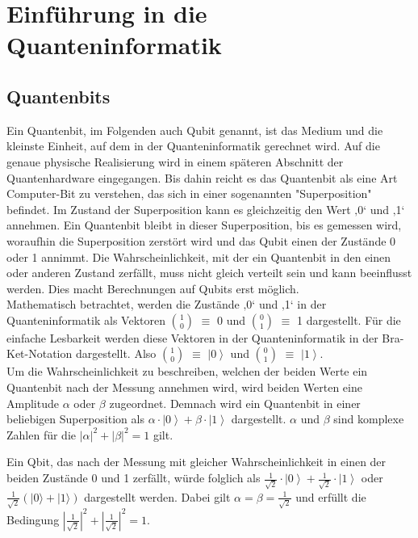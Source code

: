 \section{Einführung in die Quanteninformatik} 
\label{sec:Einführung in die Quanteninformatik}
\subsection{Quantenbits}
Ein Quantenbit, im Folgenden auch Qubit genannt, ist das Medium und die kleinste Einheit, auf dem in der Quanteninformatik gerechnet wird. Auf die genaue physische Realisierung wird in einem späteren Abschnitt der Quantenhardware eingegangen. Bis dahin reicht es das Quantenbit als eine Art Computer-Bit zu verstehen, das sich in einer sogenannten "Superposition" befindet. Im Zustand der Superposition kann es gleichzeitig den Wert ‚0‘ und ‚1‘ annehmen. Ein Quantenbit bleibt in dieser Superposition, bis es gemessen wird, woraufhin die Superposition zerstört wird und das Qubit einen der Zustände 0 oder 1 annimmt. Die Wahrscheinlichkeit, mit der ein Quantenbit in den einen oder anderen Zustand zerfällt, muss nicht gleich verteilt sein und kann beeinflusst werden. Dies macht Berechnungen auf Qubits erst möglich.\\

Mathematisch betrachtet, werden die Zustände ‚0‘ und ‚1‘ in der Quanteninformatik als Vektoren \(\binom{1}{0}\) $\equiv$ 0 und \(\binom{0}{1}\) $\equiv$ 1 dargestellt. Für die einfache Lesbarkeit werden diese Vektoren in der Quanteninformatik in der Bra-Ket-Notation dargestellt.
Also \(\binom{1}{0}\) $\equiv$ $\left|0\right\rangle$ und \(\binom{0}{1}\) $\equiv$ $\left|1\right\rangle$. \\

Um die Wahrscheinlichkeit zu beschreiben, welchen der beiden Werte ein Quantenbit nach der Messung annehmen wird, wird beiden Werten eine Amplitude $\alpha$ oder $\beta$ zugeordnet. Demnach wird ein Quantenbit in einer beliebigen Superposition als $\alpha\cdot\left|0\right\rangle+\beta\cdot\left|1\right\rangle$ dargestellt. $\alpha$ und $\beta$ sind komplexe Zahlen für die $\left|\alpha\right|^2+\left|\beta\right|^2=1$ gilt. 

Ein Qbit, das nach der Messung mit gleicher Wahrscheinlichkeit in einen der beiden Zustände 0 und 1 zerfällt, würde folglich als $\frac{1}{\sqrt2}\cdot\left|0\right\rangle+\frac{1}{\sqrt2}\cdot\left|1\right\rangle$ oder $\frac{1}{\sqrt{2}}(\left|0\right.\rangle+\left|1\right.\rangle)$ dargestellt werden. Dabei gilt $\alpha = \beta = \frac{1}{\sqrt2}$ und erfüllt die Bedingung $\left|\frac{1}{\sqrt2}\right|^2+\left|\frac{1}{\sqrt2}\right|^2=1$.\\

